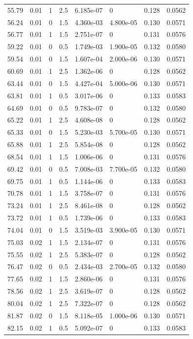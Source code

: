 \documentclass[preview]{standalone}
\begin{document}
{{{\begin{tabular}{L{1.2cm}C{1.2cm} C{0.3cm}C{0.5cm} C{1.4cm}C{1.4cm} C{1.4cm}C{1.4cm}}
  55.79  &  0.01  & 1     & 2.5 &  6.185e-07  & 0  & 0.128 &  0.0562   \\ 
  56.24  &  0.01  & 0     & 1.5 &  4.360e-03  & 4.800e-05  & 0.130 &  0.0571   \\ 
  56.77  &  0.01  & 1     & 1.5 &  2.751e-07  & 0  & 0.131 &  0.0576   \\ 
  59.22  &  0.01  & 0     & 0.5 &  1.749e-03  & 1.900e-05  & 0.132 &  0.0580   \\ 
  59.54  &  0.01  & 0     & 1.5 &  1.607e-04  & 2.000e-06  & 0.130 &  0.0571   \\ 
  60.69  &  0.01  & 1     & 2.5 &  1.362e-06  & 0  & 0.128 &  0.0562   \\ 
  63.44  &  0.01  & 0     & 1.5 &  4.427e-04  & 5.000e-06  & 0.130 &  0.0571   \\ 
  63.81  &  0.01  & 1     & 0.5 &  3.017e-06  & 0  & 0.133 &  0.0583   \\ 
  64.69  &  0.01  & 0     & 0.5 &  9.783e-07  & 0  & 0.132 &  0.0580   \\ 
  65.22  &  0.01  & 1     & 2.5 &  4.608e-08  & 0  & 0.128 &  0.0562   \\ 
  65.33  &  0.01  & 0     & 1.5 &  5.230e-03  & 5.700e-05  & 0.130 &  0.0571   \\ 
  65.88  &  0.01  & 1     & 2.5 &  5.854e-08  & 0  & 0.128 &  0.0562   \\ 
  68.54  &  0.01  & 1     & 1.5 &  1.006e-06  & 0  & 0.131 &  0.0576   \\ 
  69.42  &  0.01  & 0     & 0.5 &  7.008e-03  & 7.700e-05  & 0.132 &  0.0580   \\ 
  69.75  &  0.01  & 1     & 0.5 &  1.144e-06  & 0  & 0.133 &  0.0583   \\ 
  70.78  &  0.01  & 1     & 1.5 &  3.758e-07  & 0  & 0.131 &  0.0576   \\ 
  73.24  &  0.01  & 1     & 2.5 &  8.461e-08  & 0  & 0.128 &  0.0562   \\ 
  73.72  &  0.01  & 1     & 0.5 &  1.739e-06  & 0  & 0.133 &  0.0583   \\ 
  74.04  &  0.01  & 0     & 1.5 &  3.519e-03  & 3.900e-05  & 0.130 &  0.0571   \\ 
  75.03  &  0.02  & 1     & 1.5 &  2.134e-07  & 0  & 0.131 &  0.0576   \\ 
  75.55  &  0.02  & 1     & 2.5 &  5.383e-07  & 0  & 0.128 &  0.0562   \\ 
  76.47  &  0.02  & 0     & 0.5 &  2.434e-03  & 2.700e-05  & 0.132 &  0.0580   \\ 
  77.65  &  0.02  & 1     & 1.5 &  2.860e-06  & 0  & 0.131 &  0.0576   \\ 
  78.56  &  0.02  & 1     & 2.5 &  3.619e-07  & 0  & 0.128 &  0.0562   \\ 
  80.04  &  0.02  & 1     & 2.5 &  7.322e-07  & 0  & 0.128 &  0.0562   \\ 
  81.87  &  0.02  & 0     & 1.5 &  8.118e-05  & 1.000e-06  & 0.130 &  0.0571   \\ 
  82.15  &  0.02  & 1     & 0.5 &  5.092e-07  & 0  & 0.133 &  0.0583   \\ 
\hline 
\end{tabular} 

}}}
\end{document}
